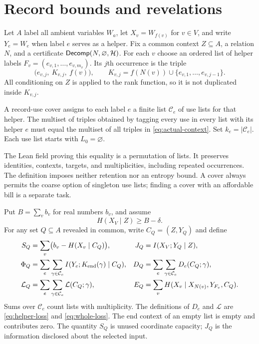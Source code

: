 \section{Record bounds and revelations}\label{sec:records}

Let $A$ label all ambient variables $W_a$, let $X_v=W_{f(v)}$ for
$v\in V$, and write $Y_e=W_e$ when label $e$ serves as a helper.
Fix a common context $Z\subseteq A$, a relation $N$, and a certificate
$\mathsf{Decomp}(N,\varnothing,\mathcal H)$. For each $v$ choose an ordered
list of helper labels
$F_v=(e_{v,1},\ldots,e_{v,m_v})$. Its $j$th occurrence is the triple
\begin{equation}
\bigl(e_{v,j},\ K_{v,j},\ f(v)\bigr),\qquad
K_{v,j}=f(N(v))\cup\{e_{v,1},\ldots,e_{v,j-1}\}.
\label{eq:actual-context}
\end{equation}
All conditioning on $Z$ is applied to the rank function, so it is not
duplicated inside $K_{v,j}$.

\begin{definition}\label{def:cover}
A record-use cover assigns to each label $e$ a finite list
$\mathcal C_e$ of use lists for that helper. The multiset of triples
obtained by tagging every use in every list with its helper $e$ must
equal the multiset of all triples in \eqref{eq:actual-context}.
Set $k_e=|\mathcal C_e|$. Each use list starts with
$L_0=\varnothing$.
\end{definition}

The Lean field proving this equality is a permutation of lists. It
preserves identities, contexts, targets, and multiplicities, including
repeated occurrences. The definition imposes neither retention nor an
entropy bound. A cover always permits the coarse option of singleton
use lists; finding a cover with an affordable bill is a separate task.

Put $B=\sum_v b_v$ for real numbers $b_v$, and assume
\begin{equation}
H(X_V\mid Z)\ge B-\delta.
\label{eq:initial-deficit}
\end{equation}
For any set $Q\subseteq A$ revealed in common, write $C_Q=(Z,Y_Q)$
and define
\begin{align}
S_Q&=\sum_v\bigl(b_v-H(X_v\mid C_Q)\bigr),&
J_Q&=I(X_V;Y_Q\mid Z),\label{eq:credits}\\
\Phi_Q&=\sum_e\sum_{\gamma\in\mathcal C_e}
             I(Y_e;K_{\rm end}(\gamma)\mid C_Q),&
D_Q&=\sum_e\sum_{\gamma\in\mathcal C_e}D_e(C_Q;\gamma),
\label{eq:cover-information}\\
\mathcal L_Q&=\sum_e\sum_{\gamma\in\mathcal C_e}
                       \mathcal L(C_Q;\gamma),&
E_Q&=\sum_v H(X_v\mid X_{N(v)},Y_{F_v},C_Q).
\label{eq:cover-errors}
\end{align}
Sums over $\mathcal C_e$ count lists with multiplicity. The definitions
of $D_e$ and $\mathcal L$ are \eqref{eq:helper-loss} and
\eqref{eq:whole-loss}. The end context of an empty list is empty and
contributes zero. The quantity $S_Q$ is unused coordinate capacity;
$J_Q$ is the information disclosed about the selected input.

